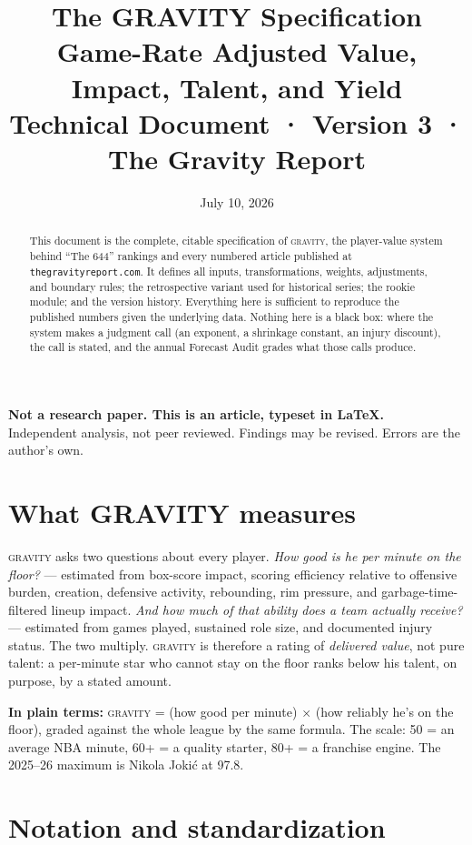 \documentclass[11pt]{article}
\title{\textbf{The GRAVITY Specification}\\[4pt]
\large Game-Rate Adjusted Value, Impact, Talent, and Yield\\[2pt]
\normalsize Technical Document · Version 3 · The Gravity Report}
\author{}
\date{July 10, 2026}
\newcommand{\gravity}{\textsc{gravity}}
\newcommand{\plainbox}[1]{\par\medskip\noindent\begin{center}%
\colorbox{court!8}{\parbox{0.93\textwidth}{\small \textbf{\textcolor{court}{In plain terms:}} #1}}%
\end{center}\medskip}
\newcommand{\statusnote}{\par\noindent\begin{center}%
\colorbox{fade!25}{\parbox{0.93\textwidth}{\centering\small
\textbf{Not a research paper. This is an article, typeset in \LaTeX.}\\[2pt]
Independent analysis, not peer reviewed. Findings may be revised. Errors are the author's own.}}%
\end{center}\smallskip}
\begin{document}
\maketitle
\vspace{-2.5em}
\statusnote

\begin{abstract}
\noindent
This document is the complete, citable specification of \gravity{}, the player-value
system behind ``The 644'' rankings and every numbered article published at
\texttt{thegravityreport.com}. It defines all inputs, transformations, weights,
adjustments, and boundary rules; the retrospective variant used for historical series;
the rookie module; and the version history. Everything here is sufficient to reproduce
the published numbers given the underlying data. Nothing here is a black box: where the
system makes a judgment call (an exponent, a shrinkage constant, an injury discount),
the call is stated, and the annual Forecast Audit grades what those calls produce.
\end{abstract}

\section{What GRAVITY measures}

\gravity{} asks two questions about every player. \emph{How good is he per minute on the
floor?} --- estimated from box-score impact, scoring efficiency relative to offensive
burden, creation, defensive activity, rebounding, rim pressure, and garbage-time-filtered
lineup impact. \emph{And how much of that ability does a team actually receive?} ---
estimated from games played, sustained role size, and documented injury status. The two
multiply. \gravity{} is therefore a rating of \emph{delivered value}, not pure talent: a
per-minute star who cannot stay on the floor ranks below his talent, on purpose, by a
stated amount.

\plainbox{\gravity{} = (how good per minute) $\times$ (how reliably he's on the floor),
graded against the whole league by the same formula. The scale: 50 = an average NBA
minute, 60+ = a quality starter, 80+ = a franchise engine. The 2025--26 maximum is
Nikola Joki\'c at 97.8.}

\section{Notation and standardization}
\end{document}
